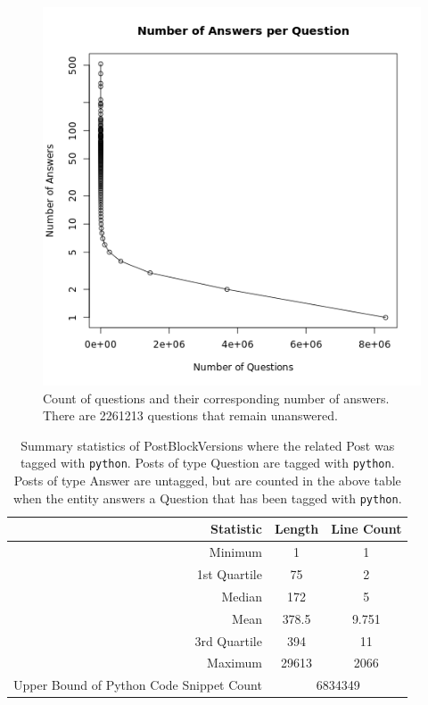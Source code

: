 \documentclass[a4paper,11pt, notitlepage]{report}
\theoremstyle{definition}
\numberwithin{equation}{section}		%
\begin{document}
\begin{figure}[ht]
    \centering
    \includegraphics[width=6in]{figures/num_ans_per_question.png}
    \caption{Count of questions and their corresponding number of answers. There are 2261213 questions that remain unanswered.}
    \label{fig:questions-to-num-answers}
\end{figure}

\begin{table}[ht]
    \centering
    \begin{tabular}{r|cc}
    \hline
    \textbf{Statistic} & \textbf{Length} &\textbf{Line Count} \\ \hline
    Minimum         & 1     & 1     \\  
    1st Quartile    & 75    & 2     \\
    Median          & 172   & 5     \\
    Mean            & 378.5 & 9.751 \\
    3rd Quartile    & 394   & 11    \\
    Maximum         & 29613 & 2066  \\ \hline
    Upper Bound of Python Code Snippet Count & \multicolumn{2}{c}{6834349} \\
    \end{tabular}
    \caption{Summary statistics of PostBlockVersions where the related Post was tagged with \texttt{python}. Posts of type Question are tagged with \texttt{python}. Posts of type Answer are untagged, but are counted in the above table when the entity answers a Question that has been tagged with \texttt{python}.}
    \label{tab:python-snippets-summary}
\end{table}
\end{document}
